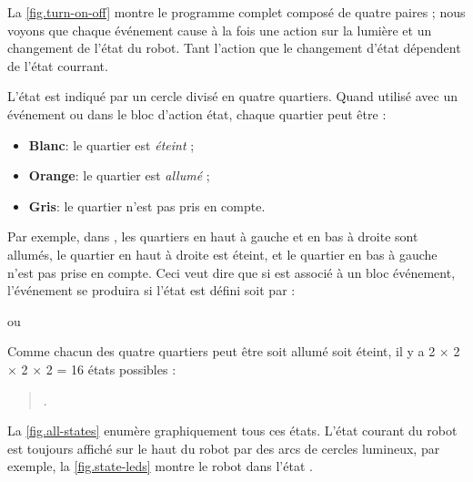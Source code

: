 La \cref{fig.turn-on-off} montre le programme complet composé de quatre paires ; nous voyons que chaque événement cause à la fois une action sur la lumière et un changement de l'état du robot.
Tant l'action que le changement d'état dépendent de l'état courrant.

\newpage


L'état est indiqué par un cercle divisé en quatre quartiers.
Quand utilisé avec un événement ou dans le bloc d'action état, chaque quartier peut être :
\begin{itemize}
	\item \textbf{Blanc}: le quartier est \emph{éteint} ;
	\item \textbf{Orange}: le quartier est \emph{allumé} ;
	\item \textbf{Gris}: le quartier n'est pas pris en compte.
\end{itemize}

Par exemple, dans , les quartiers en haut à gauche et en bas à droite sont allumés, le quartier en haut à droite est éteint, et le quartier en bas à gauche n'est pas prise en compte.
Ceci veut dire que si  est associé à un bloc événement, l'événement se produira si l'état est défini soit par :
\begin{center}
\centering {}\quad ou \quad {}
\end{center}

Comme chacun des quatre quartiers peut être soit allumé soit éteint, il y a 2 $\times$ 2 $\times$ 2 $\times$ 2 = 16 états possibles :
\begin{quote}
.
\end{quote}
La \cref{fig.all-states} enumère graphiquement tous ces états.
L'état courant du robot est toujours affiché sur le haut du robot par des arcs de cercles lumineux, par exemple, la \cref{fig.state-leds} montre le robot dans l'état .

